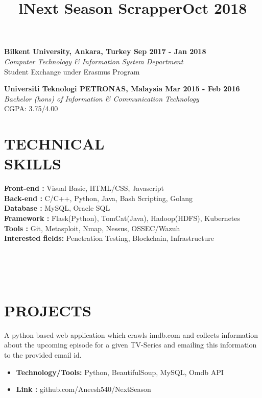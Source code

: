 \documentclass[margin]{res}
\begin{document}
\begin{resume}
\textbf{Bilkent University, Ankara, Turkey
\hfill{Sep 2017 - Jan 2018}} \\
{\sl Computer Technology \& Information System Department} \\
\hfill Student Exchange under Erasmus Program

\textbf{Universiti Teknologi PETRONAS, Malaysia 
\hfill{Mar 2015 - Feb 2016}} \\
{\sl Bachelor (hons) of Information \& Communication Technology} \\
\hfill CGPA: 3.75/4.00

\section{TECHNICAL\\SKILLS}
\textbf{Front-end : } \quad Visual Basic, HTML/CSS, Javascript
\\
\textbf{Back-end : } \quad C/C++, Python, Java, Bash Scripting, Golang
\\
\textbf{Database :} \quad \quad MySQL, Oracle SQL
\\
\textbf{Framework : } Flask(Python), TomCat(Java), Hadoop(HDFS), Kubernetes
\\
\textbf{Tools : }  \quad \quad \quad Git, Metasploit, Nmap, Nessus, OSSEC/Wazuh
\\
\textbf{Interested fields: } Penetration Testing, Blockchain, Infrastructure
\begin{format}
\title{l}\\
\\
\body\\
\end{format}
\section{PROJECTS}
\location{}
\title{\textbf{Next Season Scrapper\hfill Oct 2018}
 }
\begin{position}
A python based web application which crawls imdb.com and collects information about the upcoming episode for a given TV-Series and emailing this information to the provided email id.  
\begin{itemize}
\item \textbf{Technology/Tools:} Python, BeautifulSoup, MySQL, Omdb API
\end{itemize}
\begin{itemize}
\item \textbf{Link :} github.com/Aneesh540/NextSeason
\end{itemize}
\end{position}


\end{resume}
\end{document}
